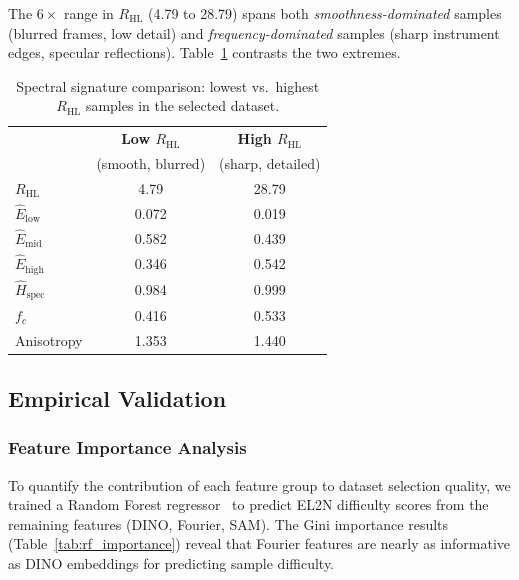 The $6\times$ range in $R_{\text{HL}}$ (4.79 to 28.79) spans both
\emph{smoothness-dominated} samples (blurred frames, low detail) and
\emph{frequency-dominated} samples (sharp instrument edges, specular
reflections).  Table~\ref{tab:spectral_extremes} contrasts the two extremes.

\begin{table}[h]
\centering
\caption{Spectral signature comparison: lowest vs.\ highest $R_{\text{HL}}$
         samples in the selected dataset.}
\label{tab:spectral_extremes}
\begin{tabular}{lcc}
\toprule
& \textbf{Low $R_{\text{HL}}$} & \textbf{High $R_{\text{HL}}$} \\
& (smooth, blurred) & (sharp, detailed) \\
\midrule
$R_{\text{HL}}$             & 4.79  & 28.79 \\
$\hat{E}_{\text{low}}$      & 0.072 & 0.019 \\
$\hat{E}_{\text{mid}}$      & 0.582 & 0.439 \\
$\hat{E}_{\text{high}}$     & 0.346 & 0.542 \\
$\hat{H}_{\text{spec}}$     & 0.984 & 0.999 \\
$f_c$                       & 0.416 & 0.533 \\
Anisotropy                  & 1.353 & 1.440 \\
\bottomrule
\end{tabular}
\end{table}


\subsection{Empirical Validation}
\label{sec:fourier_validation}

\subsubsection{Feature Importance Analysis}
\label{sec:feature_importance}

To quantify the contribution of each feature group to dataset selection
quality, we trained a Random Forest regressor~\cite{breiman2001random} to
predict EL2N difficulty scores from the remaining features (DINO, Fourier,
SAM).  The Gini importance results (Table~\ref{tab:rf_importance}) reveal
that Fourier features are nearly as informative as DINO embeddings for
predicting sample difficulty.

